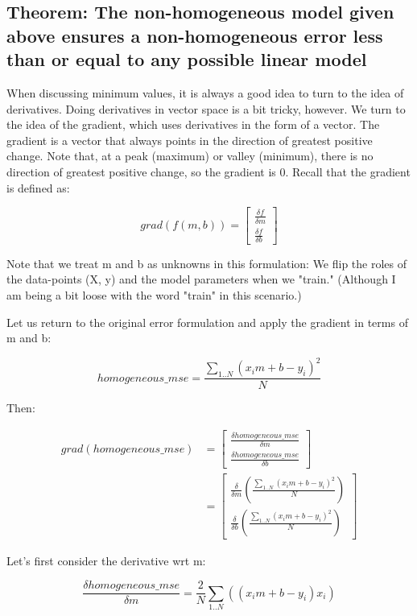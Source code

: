 \documentclass{article}
\begin{document}
\subsection{Theorem: The non-homogeneous model given above ensures a non-homogeneous error less than or equal to any possible linear model}

When discussing minimum values, it is always a good idea to turn to the idea of 
derivatives. Doing derivatives in vector space is a bit tricky, however. We turn 
to the idea of the gradient, which uses derivatives in the form of a vector. The 
gradient is a vector that always points in the direction of greatest 
positive change. Note that, at a peak (maximum) or valley (minimum), there is no 
direction of greatest positive change, so the gradient is 0. Recall that the 
gradient is defined as:

$$
grad(f(m, b)) = \begin{bmatrix}
\frac{\delta f}{\delta m} \\
\frac{\delta f}{\delta b}
\end{bmatrix}
$$

Note that we treat m and b as unknowns in this formulation: We flip the roles of 
the data-points (X, y) and the model parameters when we "train." (Although I am 
being a bit loose with the word "train" in this scenario.)

Let us return to the original error formulation and apply the gradient in terms 
of m and b:

$$
homogeneous\_mse = \frac{\sum_{1..N} (x_i m + b - y_i)^2}{N}
$$

Then:

\begin{align*}
grad(homogeneous\_mse) &= \begin{bmatrix}
\frac{\delta homogeneous\_mse}{\delta m} \\
\frac{\delta homogeneous\_mse}{\delta b}
\end{bmatrix}\\
&= \begin{bmatrix}
\frac{\delta}{\delta m} (\frac{\sum_{1..N} (x_i m + b - y_i)^2}{N}) \\
\frac{\delta}{\delta b} (\frac{\sum_{1..N} (x_i m + b - y_i)^2}{N})
\end{bmatrix}
\end{align*}

Let's first consider the derivative wrt m:

$$
\frac{\delta homogeneous\_mse}{\delta m} = \frac{2}{N} \sum_{1..N} ((x_i m + b - y_i)x_i)
$$
\end{document}
